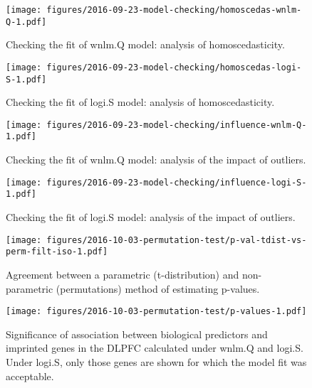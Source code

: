 \documentclass[letterpaper]{article}
\begin{document}
\begin{figure}
\begin{center}
\texttt{[image: figures/2016-09-23-model-checking/homoscedas-wnlm-Q-1.pdf]}
\end{center}
\caption{
Checking the fit of wnlm.Q model: analysis of homoscedasticity.
}
\label{fig:homoscedas-wnlm.Q}
\end{figure}

\begin{figure}
\begin{center}
\texttt{[image: figures/2016-09-23-model-checking/homoscedas-logi-S-1.pdf]}
\end{center}
\caption{
Checking the fit of logi.S model: analysis of homoscedasticity.
}
\label{fig:homoscedas-logi.S}
\end{figure}

\begin{figure}
\begin{center}
\texttt{[image: figures/2016-09-23-model-checking/influence-wnlm-Q-1.pdf]}
\end{center}
\caption{
Checking the fit of wnlm.Q model: analysis of the impact of outliers.
}
\label{fig:influence-wnlm.Q}
\end{figure}

\begin{figure}
\begin{center}
\texttt{[image: figures/2016-09-23-model-checking/influence-logi-S-1.pdf]}
\end{center}
\caption{
Checking the fit of logi.S model: analysis of the impact of outliers.
}
\label{fig:influence-logi.S}
\end{figure}

\begin{figure}
\begin{center}
\texttt{[image: figures/2016-10-03-permutation-test/p-val-tdist-vs-perm-filt-iso-1.pdf]}
\end{center}
\caption{Agreement between a parametric (t-distribution) and non-parametric
(permutations) method of estimating p-values.}
\label{fig:pval-tdist-vs-perm}
\end{figure}

\begin{figure}
\begin{center}
\texttt{[image: figures/2016-10-03-permutation-test/p-values-1.pdf]}
\end{center}
\caption{
Significance of association between biological predictors and imprinted genes
in the DLPFC calculated under wnlm.Q and logi.S.  Under logi.S, only those
genes are shown for which the model fit was acceptable.
}
\label{fig:pval}
\end{figure}
\end{document}
